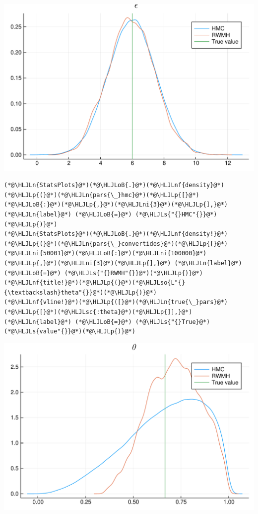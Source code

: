 \documentclass[12pt,a4paper]{article}
\newcommand{\HLJLn}[1]{#1}
\newcommand{\HLJLnf}[1]{\textcolor[RGB]{66,102,213}{#1}}
\newcommand{\HLJLs}[1]{\textcolor[RGB]{201,61,57}{#1}}
\newcommand{\HLJLsc}[1]{\textcolor[RGB]{201,61,57}{#1}}
\newcommand{\HLJLso}[1]{\textcolor[RGB]{201,61,57}{#1}}
\newcommand{\HLJLni}[1]{\textcolor[RGB]{59,151,46}{#1}}
\newcommand{\HLJLoB}[1]{\textcolor[RGB]{102,102,102}{\textbf{#1}}}
\newcommand{\HLJLp}[1]{#1}
\begin{document}
\includegraphics[width=\linewidth]{figures/dsge_and_julia_45_1.pdf}

\begin{lstlisting}
(*@\HLJLn{StatsPlots}@*)(*@\HLJLoB{.}@*)(*@\HLJLnf{density}@*)(*@\HLJLp{(}@*)(*@\HLJLn{pars{\_}hmc}@*)(*@\HLJLp{[}@*)(*@\HLJLoB{:}@*)(*@\HLJLp{,}@*)(*@\HLJLni{3}@*)(*@\HLJLp{],}@*) (*@\HLJLn{label}@*) (*@\HLJLoB{=}@*) (*@\HLJLs{"{}HMC"{}}@*)(*@\HLJLp{)}@*)
(*@\HLJLn{StatsPlots}@*)(*@\HLJLoB{.}@*)(*@\HLJLnf{density!}@*)(*@\HLJLp{(}@*)(*@\HLJLn{pars{\_}convertidos}@*)(*@\HLJLp{[}@*)(*@\HLJLni{50001}@*)(*@\HLJLoB{:}@*)(*@\HLJLni{100000}@*)(*@\HLJLp{,}@*)(*@\HLJLni{3}@*)(*@\HLJLp{],}@*) (*@\HLJLn{label}@*) (*@\HLJLoB{=}@*) (*@\HLJLs{"{}RWMH"{}}@*)(*@\HLJLp{)}@*)
(*@\HLJLnf{title!}@*)(*@\HLJLp{(}@*)(*@\HLJLso{L"{}{\textbackslash}theta"{}}@*)(*@\HLJLp{)}@*)
(*@\HLJLnf{vline!}@*)(*@\HLJLp{([}@*)(*@\HLJLn{true{\_}pars}@*)(*@\HLJLp{[}@*)(*@\HLJLsc{:theta}@*)(*@\HLJLp{]],}@*) (*@\HLJLn{label}@*) (*@\HLJLoB{=}@*) (*@\HLJLs{"{}True}@*) (*@\HLJLs{value"{}}@*)(*@\HLJLp{)}@*)
\end{lstlisting}

\includegraphics[width=\linewidth]{figures/dsge_and_julia_46_1.pdf}
\end{document}
